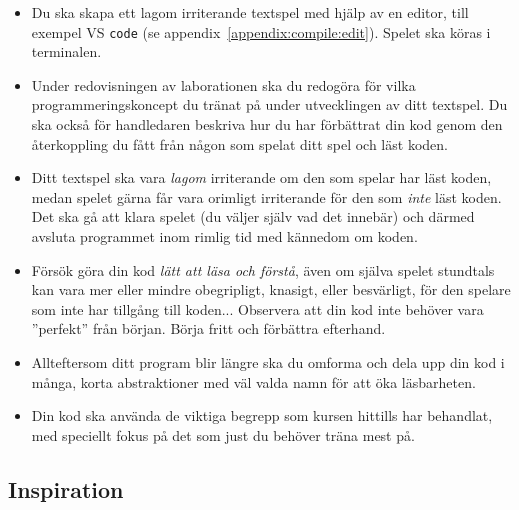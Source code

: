 \begin{itemize}
\item Du ska skapa ett lagom irriterande textspel med hjälp av en editor, till exempel VS \texttt{code} (se appendix~\ref{appendix:compile:edit}). Spelet ska köras i terminalen.

\item Under redovisningen av laborationen ska du redogöra för vilka programmeringskoncept du tränat på under utvecklingen av ditt textspel. Du ska också för handledaren beskriva hur du har förbättrat din kod genom den återkoppling du fått från någon som spelat ditt spel och läst koden.

\item Ditt textspel ska vara \emph{lagom} irriterande om den som spelar har läst koden, medan spelet gärna får vara orimligt irriterande för den som \emph{inte} läst koden. Det ska gå att klara spelet (du väljer själv vad det innebär) och därmed avsluta programmet inom rimlig tid med kännedom om koden.

\item Försök göra din kod \textit{lätt att läsa och förstå}, även om själva spelet stundtals kan vara mer eller mindre obegripligt, knasigt, eller besvärligt, för den spelare som inte har tillgång till koden... Observera att din kod inte behöver vara ''perfekt'' från början. Börja fritt och förbättra efterhand.

\item Allteftersom ditt program blir längre ska du omforma och dela upp din kod i många, korta abstraktioner med väl valda namn för att öka läsbarheten.

\item Din kod ska använda de viktiga begrepp som kursen hittills har behandlat, med speciellt fokus på det som just du behöver träna mest på.

\end{itemize}

\subsection{Inspiration}

